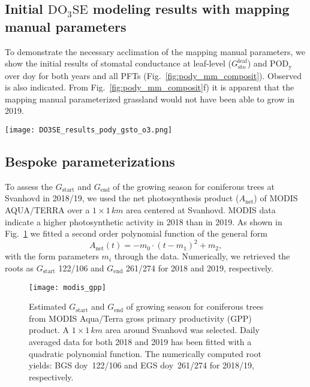 \documentclass[bg, manuscript]{copernicus}
\begin{document}
\subsection{Initial $\mathrm{DO_3SE}$ modeling results with mapping manual parameters}
To demonstrate the necessary acclimation of the mapping manual parameters, we show the initial results of stomatal conductance at leaf-level ($G_\mathrm{sto}^\mathrm{leaf}$) and $\mathrm{POD_y}$ over \unit{doy} for both years and all PFTs (Fig.~\ref{fig:pody_mm_composit}). Observed  is also indicated. From Fig.~\ref{fig:pody_mm_composit}f) it is apparent that the mapping manual parameterized grassland would not have been able to grow in 2019.

\begin{figure*}[t]
  \texttt{[image: DO3SE\_results\_pody\_gsto\_o3.png]}
  \caption{$\mathrm{DO_3SE}$ modeling results for mapping manual default parameterization. $\mathrm{POD_y}$ is shown over \unit{doy}, March--October. A flux threshold $y=1\,\unit{nmol\,m^{-2}\,s^{-1}}$ per projected leaf area (PLA) has been chosen.  are plotted on the same axis and scales as $G_\text{sto}^\text{leaf}$ but in units of $\unit{ppb}$. (a, b) deciduous tree; (c, d) coniferous tree; (e, f) perennial grassland. From left to right: 2018, 2019.}
  \label{fig:pody_mm_composit}
\end{figure*}

\subsection{Bespoke parameterizations}

To assess the $G_\mathrm{start}$  and $G_\mathrm{end}$ of the growing season for coniferous trees at Svanhovd in 2018/19, we used the net photosynthesis product ($A_\mathrm{net}$) of MODIS AQUA/TERRA over a $1\times 1\,\unit{km}$ area centered at Svanhovd. MODIS data indicate a higher photosynthetic activity in 2018 than in 2019. As shown in Fig.~\ref{fig:modis_gpp} we fitted a second order polynomial function of the general form
%
\begin{equation}
A_\mathrm{net}(t) =  -m_0\cdot(t-m_1)^2+m_2,
\end{equation}
%
with the form parameters $m_i$ through the data. Numerically, we retrieved the roots as $G_\mathrm{start}$ 122/106 and $G_\mathrm{end}$ 261/274 for 2018 and 2019, respectively. 

\begin{figure}[th]
  \texttt{[image: modis\_gpp]}
  \caption{Estimated $G_\mathrm{start}$ and $G_\mathrm{end}$ of growing season for coniferous trees from MODIS Aqua/Terra gross primary productivity (GPP) product. A $1\times 1\,\unit{km}$ area around Svanhovd was selected. Daily averaged data for both 2018 and 2019 has been fitted with a quadratic polynomial function. The numerically computed root yields: BGS \unit{doy}~122/106 and EGS \unit{doy}~261/274 for 2018/19, respectively.}
  \label{fig:modis_gpp}
\end{figure}
\end{document}
